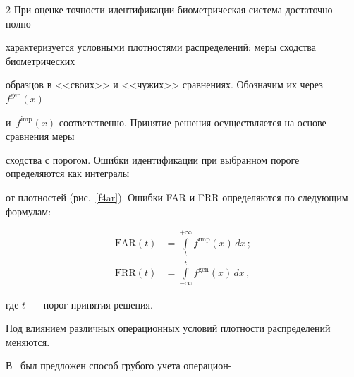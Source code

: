 \begin{multicols}{2}
  При оценке точности идентификации био\-мет\-ри\-че\-ская система достаточно полно 


характеризуется условными плотностями распределений: меры сходства биометрических 


образцов в <<своих>> и <<чужих>> сравнениях. Обозначим их через~$f^{\mathrm{gen}}(x)$ 


и~$f^{\mathrm{imp}}(x)$ соответственно. Принятие решения осуществляется на основе сравнения меры 


сходства с порогом. Ошибки идентификации при выбранном пороге определяются как интегралы 


от плотностей (рис.~\ref{f4ar}). Ошибки FAR и FRR определяются по следующим формулам:





\vspace*{-3pt}





\noindent


  \begin{align*}


  \mathrm{FAR}(t) & = \int\limits_t^{+\infty} f^{\mathrm{imp}}(x)\,dx\,;\\


  \mathrm{FRR}(t) & = \int\limits_{-\infty}^{t} f^{\mathrm{gen}}(x)\,dx\,,


  \end{align*}


где $t$~--- порог принятия решения.











  Под влиянием различных операционных условий плотности распределений меняются. 


В~\cite{6ar} был предложен способ грубого учета операцион-\linebreak\vspace*{-12pt}


\pagebreak





\end{multicols}





